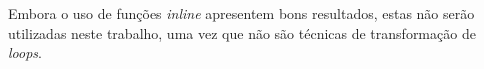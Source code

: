 Embora o uso de funções \textit{inline} apresentem bons resultados, estas não
serão utilizadas neste trabalho, uma vez que não são técnicas de transformação
de \textit{loops}.


%
%
%
%
%
%





